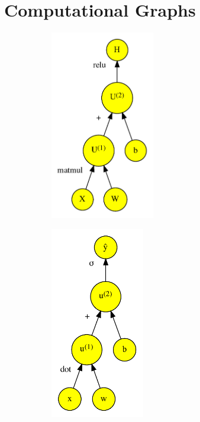 \documentclass[t]{beamer} %
\begin{document}
\section{Computational Graphs}
\begin{frame}
    \begin{figure}
        \centering
        \begin{minipage}{0.45\textwidth}
            \begin{figure}[]
                \centering
                \includegraphics[width=0.5\textwidth]{../plots/computational-graph-c-crop.pdf}
            \end{figure}
        \end{minipage}\hfill
        \begin{minipage}{0.45\textwidth}
            \centering
            \begin{figure}[]
                \includegraphics[width=0.45\textwidth]{../plots/computational-graph-b-crop.pdf}

\end{figure}
\end{minipage}
\end{figure}
\end{frame}
\end{document}
